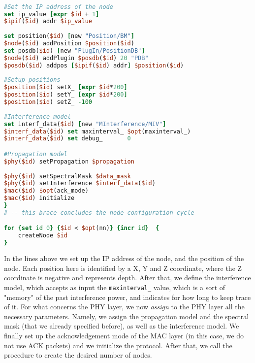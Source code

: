 \documentclass[11pt]{article}
\begin{document}
{\scriptsize\tt
\begin{lstlisting}[language=tcl]
#Set the IP address of the node
set ip_value [expr $id + 1]
$ipif($id) addr $ip_value
    
set position($id) [new "Position/BM"]
$node($id) addPosition $position($id)
set posdb($id) [new "PlugIn/PositionDB"]
$node($id) addPlugin $posdb($id) 20 "PDB"
$posdb($id) addpos [$ipif($id) addr] $position($id)
    
#Setup positions
$position($id) setX_ [expr $id*200]
$position($id) setY_ [expr $id*200]
$position($id) setZ_ -100
    
#Interference model
set interf_data($id) [new "MInterference/MIV"]
$interf_data($id) set maxinterval_ $opt(maxinterval_)
$interf_data($id) set debug_       0

#Propagation model
$phy($id) setPropagation $propagation
    
$phy($id) setSpectralMask $data_mask
$phy($id) setInterference $interf_data($id)
$mac($id) $opt(ack_mode)
$mac($id) initialize
}
# -- this brace concludes the node configuration cycle

for {set id 0} {$id < $opt(nn)} {incr id}  {
    createNode $id
}
\end{lstlisting} 
}

In the lines above we set up the IP address of the node, and the position of the node. Each position here is identified by a X, Y and Z  coordinate, where the Z coordinate is negative and represents depth.
After that, we define the interference model, which accepts as input the {\tt maxinterval\_} value, which is a sort of "memory" of the past interference power, and indicates for how long to keep trace of it.
For what concerns the PHY layer, we now \emph{assign} to the PHY layer all the necessary parameters. Namely, we assign the propagation model and the spectral mask (that we already specified before), as well as the interference model.
We finally set up the acknowledgement mode of the MAC layer (in this case, we do not use ACK packets) and we initialize the protocol.
After that, we call the procedure to create the desired number of nodes.
\end{document}
